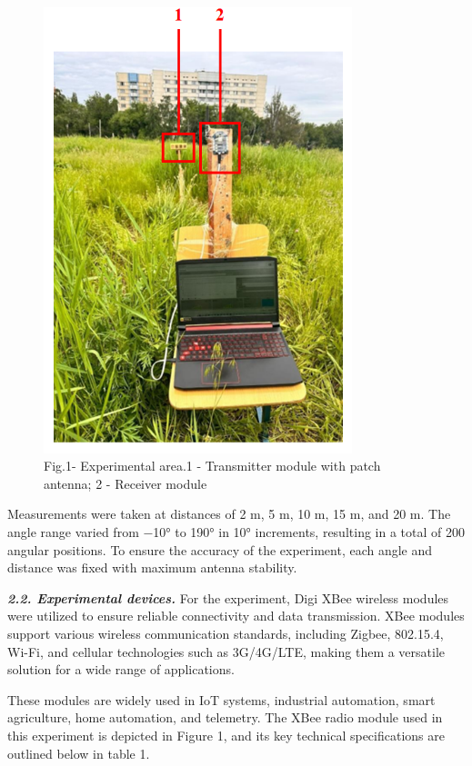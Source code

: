 \begin{figure}[H]
	\centering
	\includegraphics[width=0.8\textwidth]{media/ict/image41}
	\caption*{Fig.1- Experimental area.1 - Transmitter module with patch
antenna; 2 - Receiver module}
\end{figure}

\begin{multicols}{2}
Measurements were taken at distances of 2 m, 5 m, 10 m, 15 m, and 20 m.
The angle range varied from −10° to 190° in 10° increments, resulting in
a total of 200 angular positions. To ensure the accuracy of the
experiment, each angle and distance was fixed with maximum antenna
stability.

\emph{{\bfseries 2.2. Experimental devices.}} For the experiment, Digi XBee
wireless modules were utilized to ensure reliable connectivity and data
transmission. XBee modules support various wireless communication
standards, including Zigbee, 802.15.4, Wi-Fi, and cellular technologies
such as 3G/4G/LTE, making them a versatile solution for a wide range of
applications.

These modules are widely used in IoT systems, industrial automation,
smart agriculture, home automation, and telemetry. The XBee radio module
used in this experiment is depicted in Figure 1, and its key technical
specifications are outlined below in table 1.
\end{multicols}

